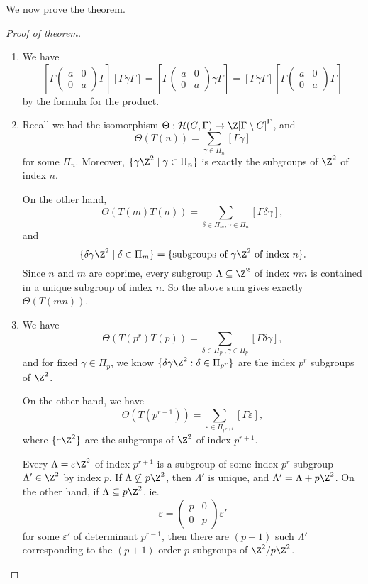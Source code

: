 \documentclass[a4paper]{article}
\begin{document}
We now prove the theorem.
\begin{proof}[Proof of theorem]\leavevmode
  \begin{enumerate}
    \item We have
      \[
        \left[\Gamma
          \begin{pmatrix}
            a & 0\\
            0 & a
        \end{pmatrix}\Gamma\right][\Gamma\gamma\Gamma] =
        \left[\Gamma
          \begin{pmatrix}
            a & 0\\
            0 & a
        \end{pmatrix}\gamma \Gamma\right]
         = [\Gamma \gamma \Gamma] \left[\Gamma
          \begin{pmatrix}
            a & 0\\
            0 & a
        \end{pmatrix}\Gamma\right]
      \]
      by the formula for the product.
    \item Recall we had the isomorphism $\Theta: \mathcal{H}(G, \Gamma) \mapsto \Z[\Gamma \setminus G]^\Gamma$, and
      \[
        \Theta(T(n)) = \sum_{\gamma \in \Pi_n} [\Gamma\gamma]
      \]
      for some $\Pi_n$. Moreover, $\{\gamma \Z^2 \mid \gamma \in \Pi_n\}$ is exactly the subgroups of $\Z^2$ of index $n$.

      On the other hand,
      \[
        \Theta(T(m)T(n)) = \sum_{\delta \in \Pi_m, \gamma \in \Pi_n} [\Gamma \delta\gamma],
      \]
      and
      \[
        \{\delta\gamma \Z^2 \mid \delta \in \Pi_m\} = \{\text{subgroups of $\gamma \Z^2$ of index $n$}\}.
      \]
      Since $n$ and $m$ are coprime, every subgroup $\Lambda \subseteq \Z^2$ of index $mn$ is contained in a unique subgroup of index $n$. So the above sum gives exactly $\Theta(T(mn))$.
    \item We have
      \[
        \Theta(T(p^r) T(p)) = \sum_{\delta \in \Pi_{p^r}, \gamma \in \Pi_p} [\Gamma \delta \gamma],
      \]
      and for fixed $\gamma \in \Pi_p$, we know $\{\delta \gamma \Z^2: \delta \in \Pi_{p^r}\}$ are the index $p^r$ subgroups of $\Z^2$.

      On the other hand, we have
      \[
        \Theta(T(p^{r + 1})) = \sum_{\varepsilon \in \Pi_{p^{r + 1}}} [\Gamma \varepsilon],
      \]
      where $\{\varepsilon \Z^2\}$ are the subgroups of $\Z^2$ of index $p^{r + 1}$.

      Every $\Lambda = \varepsilon \Z^2$ of index $p^{r + 1}$ is a subgroup of some index $p^r$ subgroup $\Lambda' \in \Z^2$ by index $p$. If $\Lambda \not \subseteq p\Z^2$, then $\Lambda'$ is unique, and $\Lambda' = \Lambda + p \Z^2$. On the other hand, if $\Lambda \subseteq p\Z^2$, ie.
      \[
        \varepsilon =
        \begin{pmatrix}
          p & 0\\
          0 & p
        \end{pmatrix} \varepsilon'
      \]
      for some $\varepsilon'$ of determinant $p^{r - 1}$, then there are $(p + 1)$ such $\Lambda'$ corresponding to the $(p + 1)$ order $p$ subgroups of $\Z^2/p\Z^2$.


\end{enumerate}
\end{proof}
\end{document}

